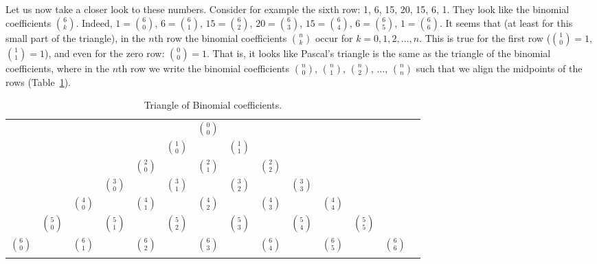 Let us now take a closer look to these numbers. 
Consider for example the sixth row: 1, 6, 15, 20, 15, 6, 1. 
They look like the binomial coefficients $\binom{6}{k}$. 
Indeed, 
$1 = \binom{6}{0}$, 
$6 = \binom{6}{1}$, 
$15 = \binom{6}{2}$, 
$20 = \binom{6}{3}$, 
$15 = \binom{6}{4}$, 
$6 = \binom{6}{5}$, 
$1 = \binom{6}{6}$. 
It seems that (at least for this small part of the triangle), 
in the $n$th row the binomial coefficients $\binom{n}{k}$ occur for $k=0, 1, 2, \dots , n$. 
This is true for the first row ($\binom{1}{0}=1$, $\binom{1}{1}=1$), 
and even for the zero row: $\binom{0}{0}=1$. 
That is, it looks like Pascal's triangle is the same as the triangle of the binomial coefficients, 
where in the $n$th row we write the binomial coefficients 
$\binom{n}{0}$, $\binom{n}{1}$, $\binom{n}{2}$, $\dots $, $\binom{n}{n}$ such that we align the midpoints of the rows (Table~\ref{tab:PascalTriangleBinomial}). 


\begin{table}[!htb]
\caption{Triangle of Binomial coefficients.}\label{tab:PascalTriangleBinomial}
\begin{center}
\begin{tabular}{cccccccccccccc} 
& & & & & & $\binom{0}{0}$ \\
\noalign{\smallskip\smallskip} 
& & & & & $\binom{1}{0}$ & & $\binom{1}{1}$ \\
\noalign{\smallskip\smallskip} 
& & & & $\binom{2}{0}$ & & $\binom{2}{1}$ & & $\binom{2}{2}$ \\
\noalign{\smallskip\smallskip} 
& & & $\binom{3}{0}$ & & $\binom{3}{1}$ & & $\binom{3}{2}$ & & $\binom{3}{3}$ \\
\noalign{\smallskip\smallskip} 
& & $\binom{4}{0}$ & & $\binom{4}{1}$ & & $\binom{4}{2}$ & & $\binom{4}{3}$ & & $\binom{4}{4}$ \\
\noalign{\smallskip\smallskip} 
& $\binom{5}{0}$ & & $\binom{5}{1}$ & & $\binom{5}{2}$ & & $\binom{5}{3}$ & & $\binom{5}{4}$ & & $\binom{5}{5}$ \\
\noalign{\smallskip\smallskip} 
$\binom{6}{0}$ & & $\binom{6}{1}$ & & $\binom{6}{2}$ & & $\binom{6}{3}$ & & $\binom{6}{4}$ & & $\binom{6}{5}$ & & $\binom{6}{6}$ \\
\noalign{\smallskip\smallskip} 
\end{tabular}
\end{center}
\end{table}

